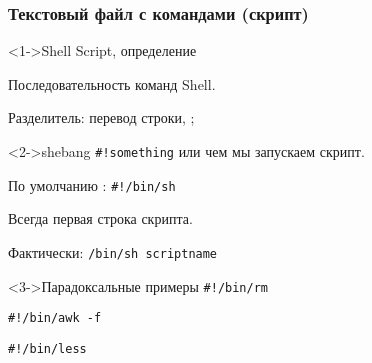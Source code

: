 \begin{frame}[fragile]
  \frametitle{Текстовый файл с командами (скрипт)}
 
  \begin{block}<1->{Shell Script, определение}  

    Последовательность команд Shell.

    Разделитель: перевод строки, \textquotedbl ; \textquotedbl
  \end{block}

  \begin{block}<2->{shebang}
    \verb+#!something+ или чем мы запускаем скрипт. 
    
    По умолчанию : \verb+#!/bin/sh+
  
    Всегда первая строка скрипта.

    Фактически: \verb+/bin/sh scriptname+
  \end{block}

  \begin{block}<3->{Парадоксальные примеры}
    \verb+#!/bin/rm+

    \verb+#!/bin/awk -f+

    \verb+#!/bin/less+
  \end{block}

\end{frame}
